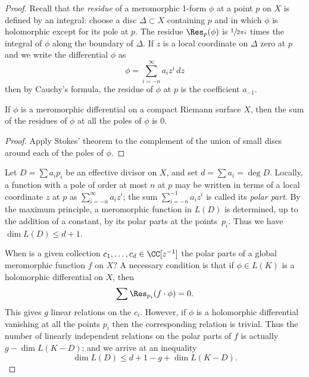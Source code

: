\begin{proof}
%
Recall that the 
\emph{residue}
of a meromorphic 1-form $\phi$ at a
%
point $p$ on $X$ is defined by an integral: choose a disc $\Delta \subset X$ containing $p$ and in which $\phi$ is holomorphic except
for its pole at $p$. The residue $\Res_p(\phi)$ is $\sfrac{1}{2\pi i}$
times the integral of $\phi$ along the boundary of $\Delta$. If $z$ is
a local coordinate on $\Delta$ zero at $p$ and we write the
differential $\phi$ as
{\meshing
$$
\phi = \sum_{i=-n}^\infty \!a_iz^i \,dz
$$
then by Cauchy's formula, the residue of $\phi$ at $p$ is the coefficient $a_{-1}$. 
}

\begin{proposition}\label{residue sum}
 If $\phi$ is a meromorphic differential on a compact Riemann surface $X$, then the sum of the residues of $\phi$
 at all the poles of $\phi$ is $0$.
 \end{proposition}
 
\begin{proof}
Apply 
Stokes' theorem
%
to the complement of the union of small discs around each of the poles of $\phi$.
\end{proof}

Let  $D = \sum a_ip_i$ be an effective divisor on $X$, and set $d = \sum a_i = \deg D$. Locally, a function with a pole of order at most $n$ at $p$ may be written in terms of a local coordinate $z$ at $p$ as $\sum_{i=-n}^\infty a_{i}z^{i} $;
the sum $\sum_{i=-n}^{-1} a_{i}z^{i}$ is called its \emph{polar part}.
By the maximum principle, a meromorphic function in $L(D)$ is determined, up to the addition of a constant, by its polar parts at the points~$p_i$. Thus we have $\dim L(D) \leq d+1$.
{\meshing\par}

When is a given collection $c_1,\dots,c_d \in \CC[z^{-1}]$ the polar parts of a global meromorphic function $f$ on $X$? A necessary condition
is that if $\phi \in L(K)$ is a holomorphic differential on $X$, then
$$
\sum \Res_{p_i}(f \cdot \phi) = 0.
$$
This gives $g$ linear relations on the $c_i$. However, if $\phi$ is a holomorphic differential vanishing at all the points $p_i$
then the corresponding relation is trivial. Thus the number of linearly independent relations on the polar parts of $f$ is actually $g - \dim L(K-D)$; and we arrive at an inequality
$$
\dim L(D) \leq d + 1 - g + \dim L(K-D).
$$


\end{proof}
